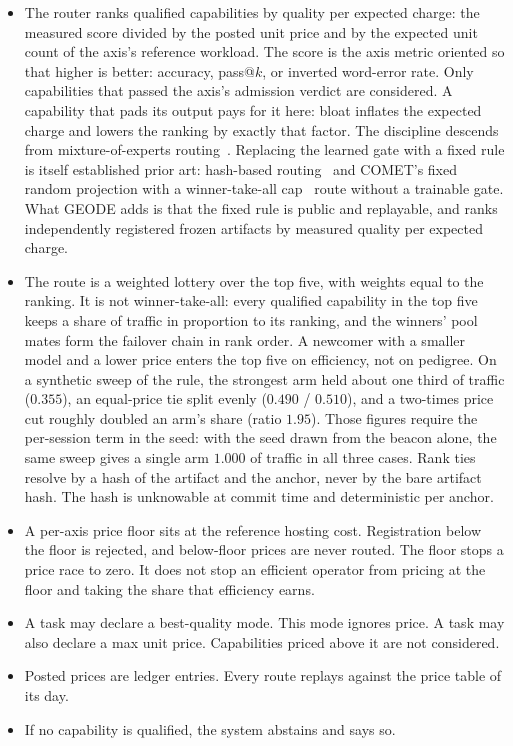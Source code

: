\documentclass[11pt]{article}
\begin{document}
\begin{itemize}
    \item The router ranks qualified capabilities by quality per
          expected charge: the measured score divided by the posted unit
          price and by the expected unit count of the axis's reference
          workload. The score is the axis metric oriented so that higher
          is better: accuracy, pass@$k$, or inverted word-error rate.
          Only capabilities that passed the axis's admission verdict are
          considered. A capability that pads its output pays for it here:
          bloat inflates the expected charge and lowers the ranking by
          exactly that factor. The discipline descends from
          mixture-of-experts routing~\cite{shazeer2017,fedus2022}.
          Replacing the learned gate with a fixed rule is itself
          established prior art: hash-based routing~\cite{roller2021} and
          COMET's fixed random projection with a winner-take-all
          cap~\cite{shaier2025} route without a trainable gate. What
          GEODE adds is that the fixed rule is public and replayable, and
          ranks independently registered frozen artifacts by measured
          quality per expected charge.
    \item The route is a weighted lottery over the top five, with
          weights equal to the ranking. It is not winner-take-all: every
          qualified capability in the top five keeps a share of traffic
          in proportion to its ranking, and the winners' pool mates form
          the failover chain in rank order. A newcomer with a smaller
          model and a lower price enters the top five on efficiency, not
          on pedigree. On a synthetic sweep of the rule, the strongest
          arm held about one third of traffic ($0.355$), an equal-price tie split
          evenly ($0.490$ / $0.510$), and a two-times price cut roughly doubled an arm's
          share (ratio $1.95$). Those figures require the per-session term in
          the seed: with the seed drawn from the beacon alone, the same
          sweep gives a single arm $1.000$ of traffic in all three cases.
          Rank ties resolve by a hash of the artifact and the
          anchor, never by the bare artifact hash. The hash is unknowable
          at commit time and deterministic per anchor.
    \item A per-axis price floor sits at the reference hosting
          cost. Registration below the floor is rejected, and
          below-floor prices are never routed. The floor stops a price
          race to zero. It does not stop an efficient operator from
          pricing at the floor and taking the share that efficiency
          earns.
    \item A task may declare a best-quality mode. This mode ignores
          price. A task may also declare a max unit price. Capabilities
          priced above it are not considered.
    \item Posted prices are ledger entries. Every route replays
          against the price table of its day.
    \item If no capability is qualified, the system abstains and says
          so.
\end{itemize}
\end{document}

